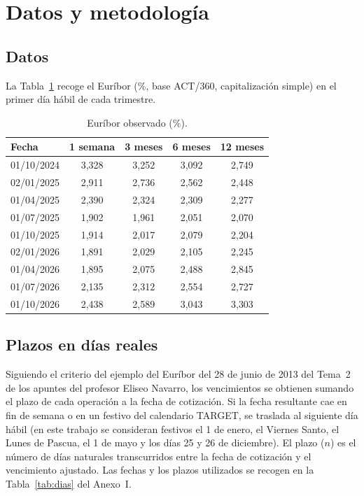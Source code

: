 \documentclass[a4paper,12pt]{article}
\begin{document}
\restoregeometry
\newpage
{}
\setcounter{page}{1}
\section{Datos y metodología}
\subsection{Datos}
La Tabla~\ref{tab:datos} recoge el Euríbor (\%, base ACT/360, capitalización simple) en el primer día hábil de cada trimestre.
\begin{table}[H]\centering\caption{Euríbor observado (\%).}\label{tab:datos}
\begin{tabular}{lcccc}\toprule Fecha & 1 semana & 3 meses & 6 meses & 12 meses\\\midrule
01/10/2024 & 3{,}328 & 3{,}252 & 3{,}092 & 2{,}749 \\
02/01/2025 & 2{,}911 & 2{,}736 & 2{,}562 & 2{,}448 \\
01/04/2025 & 2{,}390 & 2{,}324 & 2{,}309 & 2{,}277 \\
01/07/2025 & 1{,}902 & 1{,}961 & 2{,}051 & 2{,}070 \\
01/10/2025 & 1{,}914 & 2{,}017 & 2{,}079 & 2{,}204 \\
02/01/2026 & 1{,}891 & 2{,}029 & 2{,}105 & 2{,}245 \\
01/04/2026 & 1{,}895 & 2{,}075 & 2{,}488 & 2{,}845 \\
01/07/2026 & 2{,}135 & 2{,}312 & 2{,}554 & 2{,}727 \\
01/10/2026 & 2{,}438 & 2{,}589 & 3{,}043 & 3{,}303 \\
\bottomrule\end{tabular}\end{table}

\subsection{Plazos en días reales}
Siguiendo el criterio del ejemplo del Euríbor del 28 de junio de 2013 del Tema~2 de los apuntes del profesor Eliseo Navarro, los vencimientos se obtienen sumando el plazo de cada operación a la fecha de cotización. Si la fecha resultante cae en fin de semana o en un festivo del calendario TARGET, se traslada al siguiente día hábil (en este trabajo se consideran festivos el 1 de enero, el Viernes Santo, el Lunes de Pascua, el 1 de mayo y los días 25 y 26 de diciembre). El plazo ($n$) es el número de días naturales transcurridos entre la fecha de cotización y el vencimiento ajustado. Las fechas y los plazos utilizados se recogen en la Tabla~\ref{tab:dias} del Anexo~I.
\end{document}
